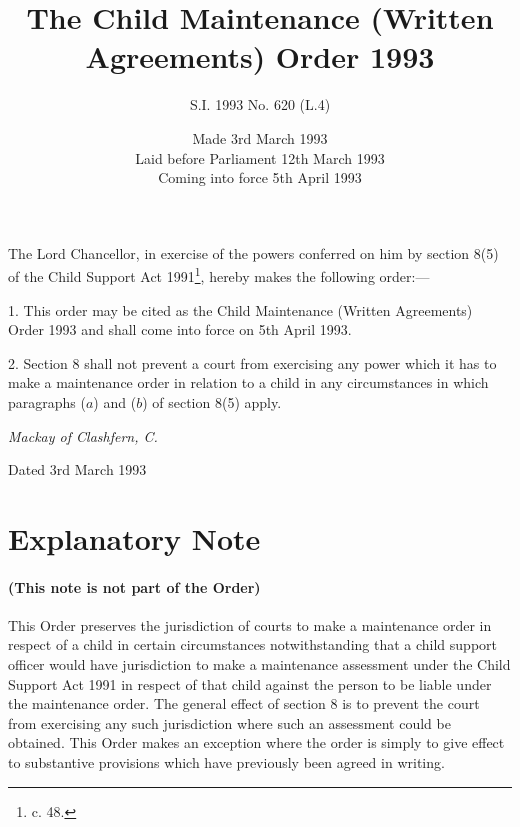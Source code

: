 \documentclass[a4paper]{article}
\title{The Child Maintenance (Written Agreements) Order 1993}
\author{S.I. 1993 No. 620 (L.4)}
\date{Made 3rd March 1993\\Laid before Parliament 12th March 1993\\Coming into force 5th April 1993}
\newcommand{\parthead}{}
\begin{document}
\maketitle

\noindent
The Lord Chancellor, in exercise of the powers conferred on him by section 8(5) of the Child Support Act 1991\footnote{ c. 48.}, hereby makes the following order:—

%
%

\setcounter{secnumdepth}{-2}

\bigskip

1.  This order may be cited as the Child Maintenance (Written Agreements) Order 1993 and shall come into force on 5th April 1993.

\medskip

2.  Section 8 shall not prevent a court from exercising any power which it has to make a maintenance order in relation to a child in any circumstances in which paragraphs ($a$) and ($b$) of section 8(5) apply.

\bigskip


{\raggedleft
\emph{Mackay of Clashfern, C.}%

}

Dated 3rd March 1993

\part{Explanatory Note}

\renewcommand\parthead{--- Explanatory Note}

\subsection*{(This note is not part of the Order)}

This Order preserves the jurisdiction of courts to make a maintenance order in respect of a child in certain circumstances notwithstanding that a child support officer would have jurisdiction to make a maintenance assessment under the Child Support Act 1991 in respect of that child against the person to be liable under the maintenance order. The general effect of section 8 is to prevent the court from exercising any such jurisdiction where such an assessment could be obtained. This Order makes an exception where the order is simply to give effect to substantive provisions which have previously been agreed in writing.
\end{document}
